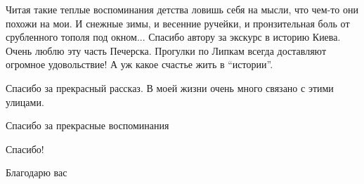 \begin{itemize}

Читая такие теплые воспоминания детства ловишь себя на мысли, что чем-то они
похожи на мои. И снежные зимы, и весенние ручейки, и пронзительная боль от
срубленного тополя под окном... Спасибо автору за экскурс в историю Киева. Очень
люблю эту часть Печерска. Прогулки по Липкам всегда доставляют огромное
удовольствие! А уж какое счастье жить в \enquote{истории}.


Спасибо за прекрасный рассказ. В моей жизни очень много связано с этими улицами.

Спасибо за прекрасные воспоминания

Спасибо!

Благодарю вас


\end{itemize} %
